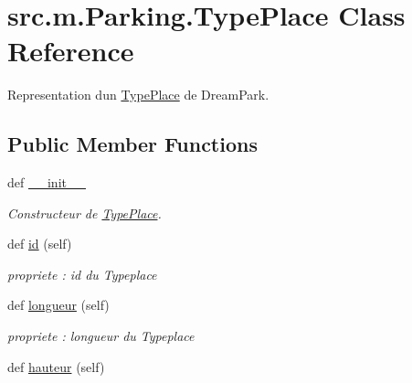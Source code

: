 \hypertarget{classsrc_1_1m_1_1_parking_1_1_type_place}{}\section{src.\+m.\+Parking.\+Type\+Place Class Reference}
\label{classsrc_1_1m_1_1_parking_1_1_type_place}


Representation d\textquotesingle{}un \hyperlink{classsrc_1_1m_1_1_parking_1_1_type_place}{Type\+Place} de Dream\+Park.  


\subsection*{Public Member Functions}
\begin{DoxyCompactItemize}
\item 
def \hyperlink{classsrc_1_1m_1_1_parking_1_1_type_place_ae3b48b35d9c887c2230d711df85cf260}{\+\_\+\+\_\+init\+\_\+\+\_\+}
\begin{DoxyCompactList}\small\item\em Constructeur de \hyperlink{classsrc_1_1m_1_1_parking_1_1_type_place}{Type\+Place}. \end{DoxyCompactList}\item 
\hypertarget{classsrc_1_1m_1_1_parking_1_1_type_place_abb0b965b808fa28828b486fbacf0b8e6}{}def \hyperlink{classsrc_1_1m_1_1_parking_1_1_type_place_abb0b965b808fa28828b486fbacf0b8e6}{id} (self)\label{classsrc_1_1m_1_1_parking_1_1_type_place_abb0b965b808fa28828b486fbacf0b8e6}

\begin{DoxyCompactList}\small\item\em propriete \+: id du Typeplace \end{DoxyCompactList}\item 
\hypertarget{classsrc_1_1m_1_1_parking_1_1_type_place_ac7136ba03b94801b8623531c8effd029}{}def \hyperlink{classsrc_1_1m_1_1_parking_1_1_type_place_ac7136ba03b94801b8623531c8effd029}{longueur} (self)\label{classsrc_1_1m_1_1_parking_1_1_type_place_ac7136ba03b94801b8623531c8effd029}

\begin{DoxyCompactList}\small\item\em propriete \+: longueur du Typeplace \end{DoxyCompactList}\item 
\hypertarget{classsrc_1_1m_1_1_parking_1_1_type_place_aa162d7d5dc63282357145a772d851837}{}def \hyperlink{classsrc_1_1m_1_1_parking_1_1_type_place_aa162d7d5dc63282357145a772d851837}{hauteur} (self)\label{classsrc_1_1m_1_1_parking_1_1_type_place_aa162d7d5dc63282357145a772d851837}


\end{DoxyCompactItemize}
